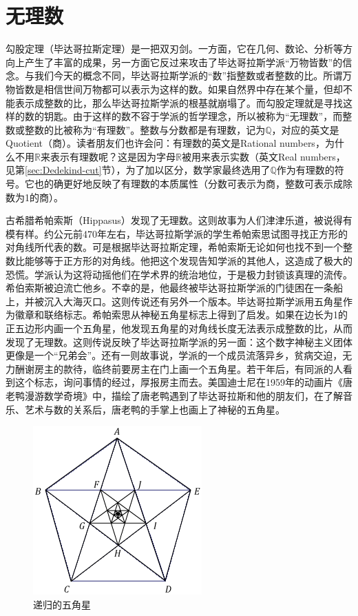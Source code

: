 \documentclass[b5paper]{ctexart}
\begin{document}
\section{无理数}
勾股定理（毕达哥拉斯定理）是一把双刃剑。一方面，它在几何、数论、分析等方向上产生了丰富的成果，另一方面它反过来攻击了毕达哥拉斯学派“万物皆数”的信念。与我们今天的概念不同，毕达哥拉斯学派的“数”指整数或者整数的比。所谓万物皆数是相信世间万物都可以表示为这样的数。如果自然界中存在某个量，但却不能表示成整数的比，那么毕达哥拉斯学派的根基就崩塌了。而勾股定理就是寻找这样的数的钥匙。由于这样的数不容于学派的哲学理念，所以被称为“无理数”，而整数或整数的比被称为“有理数”。整数与分数都是有理数，记为$\mathbb{Q}$，对应的英文是Quotient（商）。读者朋友们也许会问：有理数的英文是Rational numbers，为什么不用$\mathbb{R}$来表示有理数呢？这是因为字母$\mathbb{R}$被用来表示实数（英文Real numbers，见第\ref{sec:Dedekind-cut}节），为了加以区分，数学家最终选用了$\mathbb{Q}$作为有理数的符号。它也的确更好地反映了有理数的本质属性（分数可表示为商，整数可表示成除数为1的商）。

古希腊希帕索斯（Hippasus）发现了无理数。这则故事为人们津津乐道，被说得有模有样。约公元前470年左右，毕达哥拉斯学派的学生希帕索思试图寻找正方形的对角线所代表的数。可是根据毕达哥拉斯定理，希帕索斯无论如何也找不到一个整数比能够等于正方形的对角线。他把这个发现告知学派的其他人，这造成了极大的恐慌。学派认为这将动摇他们在学术界的统治地位，于是极力封锁该真理的流传。希伯索斯被迫流亡他乡。不幸的是，他最终被毕达哥拉斯学派的门徒困在一条船上，并被沉入大海灭口。这则传说还有另外一个版本。毕达哥拉斯学派用五角星作为徽章和联络标志。希帕索思从神秘五角星标志上得到了启发。如果在边长为1的正五边形内画一个五角星，他发现五角星的对角线长度无法表示成整数的比，从而发现了无理数。这则传说反映了毕达哥拉斯学派的另一面：这个数字神秘主义团体更像是一个“兄弟会”。还有一则故事说，学派的一个成员流落异乡，贫病交迫，无力酬谢房主的款待，临终前要房主在门上画一个五角星。若干年后，有同派的人看到这个标志，询问事情的经过，厚报房主而去\cite{HanXueTao16}。美国迪士尼在1959年的动画片《唐老鸭漫游数学奇境》中，描绘了唐老鸭遇到了毕达哥拉斯和他的朋友们，在了解音乐、艺术与数的关系后，唐老鸭的手掌上也画上了神秘的五角星。

\begin{figure}[htbp]
 \centering
 \includegraphics[scale=0.5]{img/pentagram}
 \caption{递归的五角星}
 \label{fig:pentagram}
\end{figure}
\end{document}
